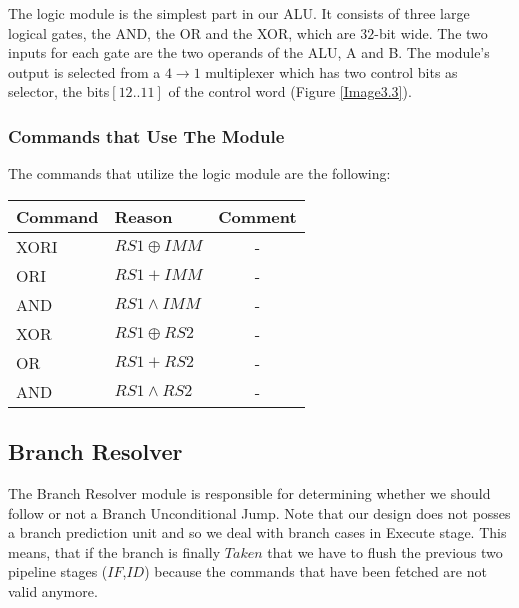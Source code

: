 	The logic module is the simplest part in our ALU. It consists of three large logical gates, the AND, the OR and the XOR, which are $32$-bit wide. The two inputs for each gate are the two operands of the ALU, A and B. The module's output is selected from a $4\rightarrow1$ multiplexer which has two control bits as selector, the bits$[12..11]$ of the control word (Figure \ref{Image3.3}).
	
	 \subsubsection{Commands that Use The Module}
	 
	 The commands that utilize the logic module are the following:
	 
	 \vspace{2mm}
	 \begin{center}
	 \begin{threeparttable}[h!]
	 	
	 	\begin{tabular}{|l|l|c|} \hline
	 		\setrow{\bfseries}Command  &\setrow{\bfseries} Reason &\setrow{\bfseries} Comment \\\hline
	 	    XORI     & $RS1 \oplus IMM$		& -\\\hline
	 		ORI      & $RS1 +  IMM$			& -\\\hline
	 		AND      & $RS1 \land  IMM$		& -\\\hline
	 		XOR      & $RS1 \oplus RS2$		& -\\\hline
	 		OR       & $RS1 +  RS2$     	& -\\\hline
	 		AND 	 & $RS1 \land RS2$      & -\\\hline
	 		
	 	\end{tabular}
	 	
	 	\label{Table 3.5}
	 	\vspace{3mm}
	 \end{threeparttable}
 	 \end{center}
  
  	\clearpage
  	
  	\subsection{\textcolor{byzantium} {Branch Resolver}}
  	The Branch Resolver module is responsible for determining whether we should follow or not a Branch Unconditional Jump. Note that our design does not posses a branch prediction unit and so we deal with branch cases in Execute stage. This means, that if the branch is finally $Taken$ that we have to flush the previous two pipeline stages ($IF$,$ID$) because the commands that have been fetched are not valid anymore. \\
  	
